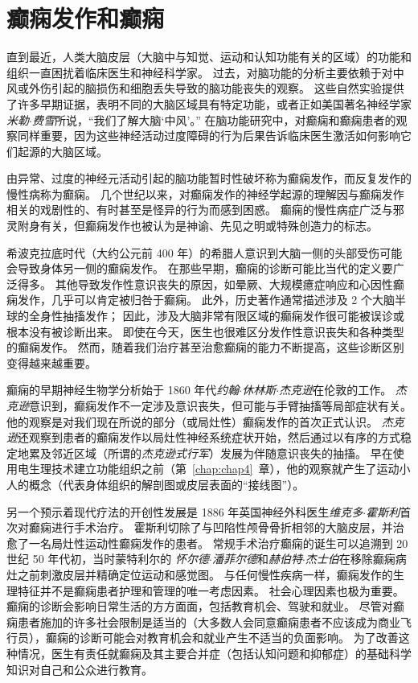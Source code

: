 \chapter{癫痫发作和癫痫} \label{chap:chap58}

直到最近，人类大脑皮层（大脑中与知觉、运动和认知功能有关的区域）的功能和组织一直困扰着临床医生和神经科学家。
过去，对脑功能的分析主要依赖于对中风或外伤引起的脑损伤和细胞丢失导致的脑功能丧失的观察。
这些自然实验提供了许多早期证据，表明不同的大脑区域具有特定功能，或者正如美国著名神经学家\textit{米勒$\cdot$费雪}所说，“我们了解大脑‘中风’。”
在脑功能研究中，对癫痫和癫痫患者的观察同样重要，因为这些神经活动过度障碍的行为后果告诉临床医生激活如何影响它们起源的大脑区域。


由异常、过度的神经元活动引起的脑功能暂时性破坏称为癫痫发作，而反复发作的慢性病称为癫痫。
几个世纪以来，对癫痫发作的神经学起源的理解因与癫痫发作相关的戏剧性的、有时甚至是怪异的行为而感到困惑。
癫痫的慢性病症广泛与邪灵附身有关，但癫痫发作也被认为是神谕、先见之明或特殊创造力的标志。


希波克拉底时代（大约公元前 400 年）的希腊人意识到大脑一侧的头部受伤可能会导致身体另一侧的癫痫发作。
在那些早期，癫痫的诊断可能比当代的定义要广泛得多。
其他导致发作性意识丧失的原因，如晕厥、大规模癔症响应和心因性癫痫发作，几乎可以肯定被归咎于癫痫。
此外，历史著作通常描述涉及 2 个大脑半球的全身性抽搐发作；
因此，涉及大脑非常有限区域的癫痫发作很可能被误诊或根本没有被诊断出来。
即使在今天，医生也很难区分发作性意识丧失和各种类型的癫痫发作。
然而，随着我们治疗甚至治愈癫痫的能力不断提高，这些诊断区别变得越来越重要。


癫痫的早期神经生物学分析始于 1860 年代\textit{约翰$\cdot$休林斯$\cdot$杰克逊}在伦敦的工作。
\textit{杰克逊}意识到，癫痫发作不一定涉及意识丧失，但可能与手臂抽搐等局部症状有关。
他的观察是对我们现在所说的部分（或局灶性）癫痫发作的首次正式认识。
\textit{杰克逊}还观察到患者的癫痫发作以局灶性神经系统症状开始，然后通过以有序的方式稳定地累及邻近区域（所谓的\textit{杰克逊式行军}）发展为伴随意识丧失的抽搐。
早在使用电生理技术建立功能组织之前（第~\ref{chap:chap4}~章），他的观察就产生了运动小人的概念（代表身体组织的解剖图或皮层表面的“接线图”）。


另一个预示着现代疗法的开创性发展是 1886 年英国神经外科医生\textit{维克多$\cdot$霍斯利}首次对癫痫进行手术治疗。
霍斯利切除了与凹陷性颅骨骨折相邻的大脑皮层，并治愈了一名局灶性运动性癫痫发作的患者。
常规手术治疗癫痫的诞生可以追溯到 20 世纪 50 年代初，当时蒙特利尔的 \textit{怀尔德$\cdot$潘菲尔德}和\textit{赫伯特$\cdot$杰士伯}在移除癫痫病灶之前刺激皮层并精确定位运动和感觉图。
与任何慢性疾病一样，癫痫发作的生理特征并不是癫痫患者护理和管理的唯一考虑因素。
社会心理因素也极为重要。
癫痫的诊断会影响日常生活的方方面面，包括教育机会、驾驶和就业。
尽管对癫痫患者施加的许多社会限制是适当的（大多数人会同意癫痫患者不应该成为商业飞行员），癫痫的诊断可能会对教育机会和就业产生不适当的负面影响。
为了改善这种情况，医生有责任就癫痫及其主要合并症（包括认知问题和抑郁症）的基础科学知识对自己和公众进行教育。



